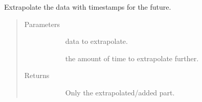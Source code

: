 \documentclass[letterpaper,10pt,english]{sphinxmanual}
\begin{document}
\begin{fulllineitems}
\label{\detokenize{autoapi/src/preprocess/preprocess/index:src.preprocess.preprocess.extrapolate_timestamps}}
Extrapolate the data with timestamps for the future.
\begin{quote}\begin{description}
\item[{Parameters}] \leavevmode\begin{description}
\item[{}] \leavevmode{[}\sphinxcode{\sphinxupquote{pd.DataFrame}}{]}
data to extrapolate.

\item[{}] \leavevmode{[}\sphinxcode{\sphinxupquote{dt.timedelta}}{]}
the amount of time to extrapolate further.

\end{description}

\item[{Returns}] \leavevmode\begin{description}
\item[{}] \leavevmode
Only the extrapolated/added part.

\end{description}

\end{description}\end{quote}

\end{fulllineitems}



\subparagraph{}
\label{\detokenize{autoapi/src/preprocess/update_extremes/index:module-src.preprocess.update_extremes}}\label{\detokenize{autoapi/src/preprocess/update_extremes/index:src-preprocess-update-extremes}}\label{\detokenize{autoapi/src/preprocess/update_extremes/index::doc}}

\subsubsection{}
\label{\detokenize{autoapi/src/utils/index:module-src.utils}}\label{\detokenize{autoapi/src/utils/index:src-utils}}\label{\detokenize{autoapi/src/utils/index::doc}}
\end{document}
